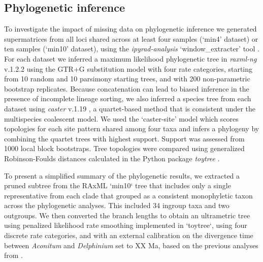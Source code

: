 \documentclass[11pt]{article}
\begin{document}
\subsection{Phylogenetic inference}
To investigate the impact of missing data on phylogenetic inference 
we generated supermatrices from all loci shared across at least four 
samples (`min4' dataset) or ten samples (`min10' dataset), using the
\emph{ipyrad-analysis} ‘window\_extracter’ tool \citep{eaton_ipyrad_2020}.
% 
For each dataset we inferred a maximum likelihood phylogenetic tree in
\emph{raxml-ng} v.1.2.2 \citep{kozlov_2019} using the GTR+G substitution
model with four rate categories, starting from 10 random and 10 parsimony 
starting trees, and with 200 non-parametric bootstrap replicates. 
% 
Because concatenation can lead to biased inference in the presence of incomplete
lineage sorting, we also inferred a species tree from each dataset using 
\emph{caster} v.1.19 \citep{zhang_2025}, a quartet-based method that is 
consistent under the multispecies coalescent model. 
We used the `caster-site’ model which scores topologies for each site pattern 
shared among four taxa and infers a phylogeny by combining the quartet
trees with highest support. Support was assessed from 1000 local block bootstraps. 
% 
Tree topologies were compared using generalized Robinson-Foulds distances 
calculated in the Python package \emph{toytree} \citep{eaton_toytree_2020}. 


To present a simplified summary of the phylogenetic results, we extracted
a pruned subtree from the RAxML `min10` tree that includes only a single
representative from each clade that grouped as a consistent monophyletic taxon
across the phylogenetic analyses. This included 34 ingroup taxa and two
outgroups. We then converted the branch lengths to obtain an ultrametric
tree using penalized likelihood rate smoothing implemented in `toytree`,
using four discrete rate categories, and with an external calibration on 
the divergence time between \emph{Aconitum} and
\emph{Delphinium} set to XX Ma, based on the previous analyses from 
\citep{Jabbour}.
\end{document}
